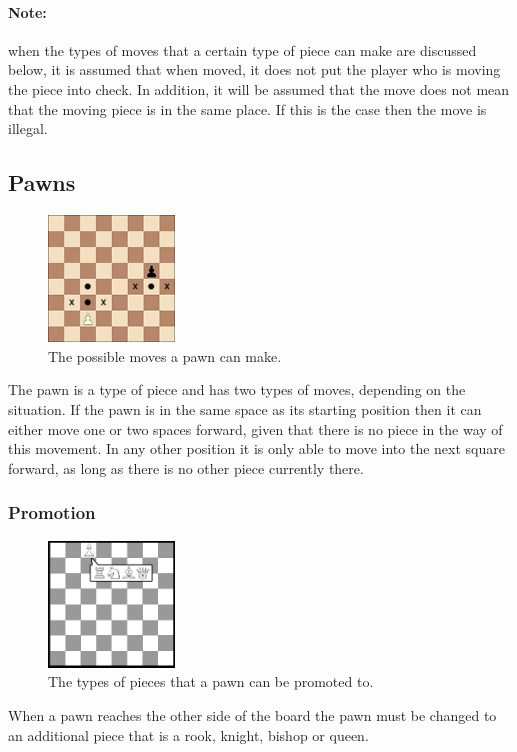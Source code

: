 \paragraph{Note:}when the types of moves that a certain type of piece can make are discussed below, it is assumed that when moved, it does not put the player who is moving the piece into check. In addition, it will be assumed that the move does not mean that the moving piece is in the same place. If this is the case then the move is illegal.
\subsection{Pawns}
\begin{figure}[H]
\centering
	\includegraphics[width=0.3\textwidth]{images/boards/pawn_movement}
	\caption{The possible moves a pawn can make.}
\end{figure}
The pawn is a type of piece and has two types of moves, depending on the situation. If the pawn is in the same space as its starting position then it can either move one or two spaces forward, given that there is no piece in the way of this movement. In any other position it is only able to move into the next square forward, as long as there is no other piece currently there. 
\subsubsection{Promotion}
\begin{figure}[H]
\centering
	\includegraphics[width=0.3\textwidth]{images/boards/promotion}
	\caption{The types of pieces that a pawn can be promoted to.}
\end{figure}
When a pawn reaches the other side of the board the pawn must be changed to an additional piece that is a rook, knight, bishop or queen.
